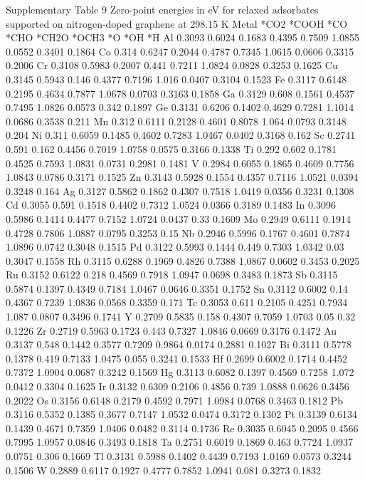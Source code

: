 Supplementary Table 9
Zero-point energies in eV for relaxed adsorbates supported on nitrogen-doped graphene at 298.15 K
Metal	*CO2	*COOH	*CO	*CHO	*CH2O	*OCH3	*O	*OH	*H
Al	0.3093	0.6024	0.1683	0.4395	0.7509	1.0855	0.0552	0.3401	0.1864
Co	0.314	0.6247	0.2044	0.4787	0.7345	1.0615	0.0606	0.3315	0.2006
Cr	0.3108	0.5983	0.2007	0.441	0.7211	1.0824	0.0828	0.3253	0.1625
Cu	0.3145	0.5943	0.146	0.4377	0.7196	1.016	0.0407	0.3104	0.1523
Fe	0.3117	0.6148	0.2195	0.4634	0.7877	1.0678	0.0703	0.3163	0.1858
Ga	0.3129	0.608	0.1561	0.4537	0.7495	1.0826	0.0573	0.342	0.1897
Ge	0.3131	0.6206	0.1402	0.4629	0.7281	1.1014	0.0686	0.3538	0.211
Mn	0.312	0.6111	0.2128	0.4601	0.8078	1.064	0.0793	0.3148	0.204
Ni	0.311	0.6059	0.1485	0.4602	0.7283	1.0467	0.0402	0.3168	0.162
Sc	0.2741	0.591	0.162	0.4456	0.7019	1.0758	0.0575	0.3166	0.1338
Ti	0.292	0.602	0.1781	0.4525	0.7593	1.0831	0.0731	0.2981	0.1481
V	0.2984	0.6055	0.1865	0.4609	0.7756	1.0843	0.0786	0.3171	0.1525
Zn	0.3143	0.5928	0.1554	0.4357	0.7116	1.0521	0.0394	0.3248	0.164
Ag	0.3127	0.5862	0.1862	0.4307	0.7518	1.0419	0.0356	0.3231	0.1308
Cd	0.3055	0.591	0.1518	0.4402	0.7312	1.0524	0.0366	0.3189	0.1483
In	0.3096	0.5986	0.1414	0.4477	0.7152	1.0724	0.0437	0.33	0.1609
Mo	0.2949	0.6111	0.1914	0.4728	0.7806	1.0887	0.0795	0.3253	0.15
Nb	0.2946	0.5996	0.1767	0.4601	0.7874	1.0896	0.0742	0.3048	0.1515
Pd	0.3122	0.5993	0.1444	0.449	0.7303	1.0342	0.03	0.3047	0.1558
Rh	0.3115	0.6288	0.1969	0.4826	0.7388	1.0867	0.0602	0.3453	0.2025
Ru	0.3152	0.6122	0.218	0.4569	0.7918	1.0947	0.0698	0.3483	0.1873
Sb	0.3115	0.5874	0.1397	0.4349	0.7184	1.0467	0.0646	0.3351	0.1752
Sn	0.3112	0.6002	0.14	0.4367	0.7239	1.0836	0.0568	0.3359	0.171
Tc	0.3053	0.611	0.2105	0.4251	0.7934	1.087	0.0807	0.3496	0.1741
Y	0.2709	0.5835	0.158	0.4307	0.7059	1.0703	0.05	0.32	0.1226
Zr	0.2719	0.5963	0.1723	0.443	0.7327	1.0846	0.0669	0.3176	0.1472
Au	0.3137	0.548	0.1442	0.3577	0.7209	0.9864	0.0174	0.2881	0.1027
Bi	0.3111	0.5778	0.1378	0.419	0.7133	1.0475	0.055	0.3241	0.1533
Hf	0.2699	0.6002	0.1714	0.4452	0.7372	1.0904	0.0687	0.3242	0.1569
Hg	0.3113	0.6082	0.1397	0.4569	0.7258	1.072	0.0412	0.3304	0.1625
Ir	0.3132	0.6309	0.2106	0.4856	0.739	1.0888	0.0626	0.3456	0.2022
Os	0.3156	0.6148	0.2179	0.4592	0.7971	1.0984	0.0768	0.3463	0.1812
Pb	0.3116	0.5352	0.1385	0.3677	0.7147	1.0532	0.0474	0.3172	0.1302
Pt	0.3139	0.6134	0.1439	0.4671	0.7359	1.0406	0.0482	0.3114	0.1736
Re	0.3035	0.6045	0.2095	0.4566	0.7995	1.0957	0.0846	0.3493	0.1818
Ta	0.2751	0.6019	0.1869	0.463	0.7724	1.0937	0.0751	0.306	0.1669
Tl	0.3131	0.5988	0.1402	0.4439	0.7193	1.0169	0.0573	0.3244	0.1506
W	0.2889	0.6117	0.1927	0.4777	0.7852	1.0941	0.081	0.3273	0.1832


